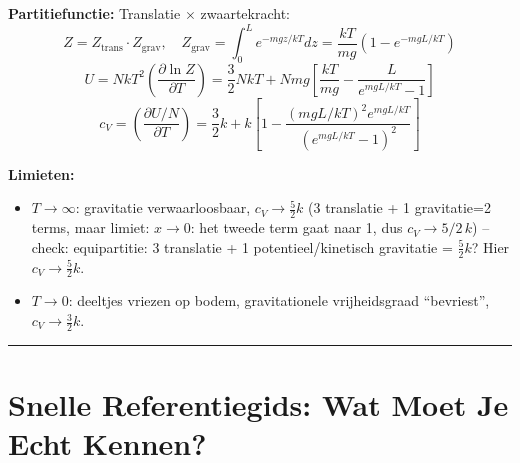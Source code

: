 \documentclass[10pt,a4paper]{article}
\newcommand{\pder}[2]{\left(\frac{\partial #1}{\partial #2}\right)}
\begin{document}
\begin{oplossing}
\textbf{Partitiefunctie:} Translatie $\times$ zwaartekracht:
$$Z = Z_\text{trans} \cdot Z_\text{grav}, \quad Z_\text{grav} = \int_0^L e^{-mgz/kT}dz = \frac{kT}{mg}(1-e^{-mgL/kT})$$
$$U = NkT^2\pder{\ln Z}{T} = \frac{3}{2}NkT + Nmg\left[\frac{kT}{mg} - \frac{L}{e^{mgL/kT}-1}\right]$$
$$c_V = \pder{U/N}{T} = \frac{3}{2}k + k\left[1 - \frac{(mgL/kT)^2 e^{mgL/kT}}{(e^{mgL/kT}-1)^2}\right]$$

\textbf{Limieten:}
\begin{itemize}
  \item $T\to\infty$: gravitatie verwaarloosbaar, $c_V \to \frac{5}{2}k$ (3 translatie + 1 gravitatie=2 terms, maar limiet: $x\to0$: het tweede term gaat naar 1, dus $c_V\to 5/2\, k$) \quad -- check: equipartitie: 3 translatie + 1 potentieel/kinetisch gravitatie = $\frac{5}{2}k$? Hier $c_V\to\frac{5}{2}k$.
  \item $T\to0$: deeltjes vriezen op bodem, gravitationele vrijheidsgraad ``bevriest'', $c_V \to \frac{3}{2}k$.
\end{itemize}
\end{oplossing}

\noindent\textcolor{headerbg}{\rule{\linewidth}{1pt}}

\section{Snelle Referentiegids: Wat Moet Je Echt Kennen?}
\end{document}
